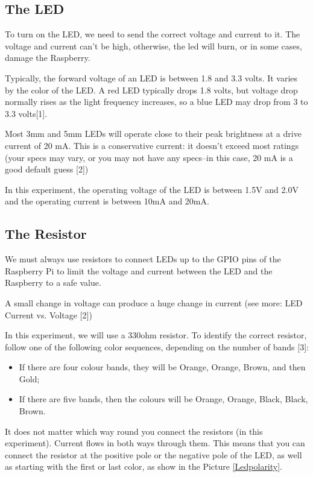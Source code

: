 \documentclass[10pt,twoside,english]{_support/latex/sbabook/sbabook}
\begin{document}
\subsection{The LED}
To turn on the LED, we need to send the correct voltage and current to it. The voltage and current can’t be high, otherwise, the led will burn, or in some cases, damage the Raspberry.

Typically, the forward voltage of an LED is between 1.8 and 3.3 volts. It varies by the color of the LED. A red LED typically drops 1.8 volts, but voltage drop normally rises as the light frequency increases, so a blue LED may drop from 3 to 3.3 volts{[}1{]}.

Most 3mm and 5mm LEDs will operate close to their peak brightness at a drive current of 20 mA. This is a conservative current: it doesn’t exceed most ratings (your specs may vary, or you may not have any specs–in this case, 20 mA is a good default guess {[}2{]})

In this experiment, the operating voltage of the LED is between 1.5V and 2.0V and the operating current is between 10mA and 20mA.
\subsection{The Resistor}
We must always use resistors to connect LEDs up to the GPIO pins of the Raspberry Pi to limit the voltage and current between the LED and the Raspberry to a safe value.

A small change in voltage can produce a huge change in current (see more: LED Current vs. Voltage {[}2{]})

In this experiment, we will use a 330ohm resistor. To identify the correct resistor, follow one of the following color sequences, depending on the number of bands {[}3{]}:

\begin{itemize}
\item If there are four colour bands, they will be Orange, Orange, Brown, and then Gold;
\item If there are five bands, then the colours will be Orange, Orange, Black, Black, Brown.
\end{itemize}

It does not matter which way round you connect the resistors (in this experiment). Current flows in both ways through them. This means that you can connect the resistor at the positive pole or the negative pole of the LED, as well as starting with the first or last color, as show in the Picture \ref{Ledpolarity}.
\end{document}
